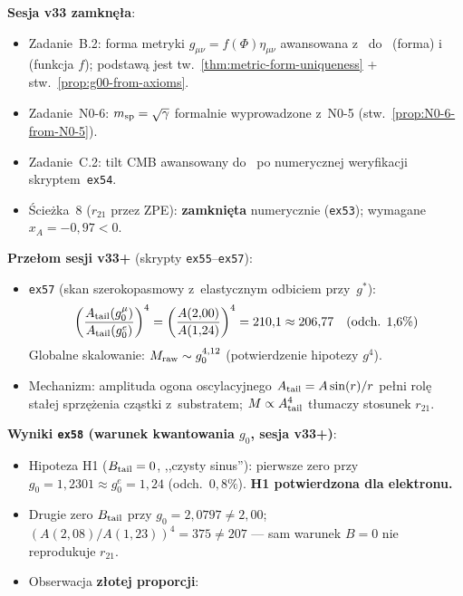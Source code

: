 \begin{remark}\label{rem:status-priority}
\textbf{Sesja v33 zamkn\k{e}\l{}a}:
\begin{itemize}[nosep]
  \item Zadanie~B.2: forma metryki
    $g_{\mu\nu} = f(\Phi)\eta_{\mu\nu}$ awansowana
    z~ do~ (forma)
    i~ (funkcja $f$);
    podstaw\k{a} jest tw.~\ref{thm:metric-form-uniqueness}
    + stw.~\ref{prop:g00-from-axioms}.
  \item Zadanie~N0-6: $m_{\rm sp} = \sqrt{\gamma}$ formalnie wyprowadzone
    z~N0-5 (stw.~\ref{prop:N0-6-from-N0-5}).
  \item Zadanie~C.2: tilt CMB awansowany do~
    po numerycznej weryfikacji skryptem~\texttt{ex54}.
  \item \'Scie\.zka~8 ($r_{21}$ przez ZPE): \textbf{zamkni\k{e}ta} numerycznie
    (\texttt{ex53}); wymagane $x_A = -0{,}97 < 0$.
\end{itemize}
\textbf{Prze\l{}om sesji v33+} (skrypty \texttt{ex55}--\texttt{ex57}):
\begin{itemize}[nosep]
  \item \texttt{ex57} (skan szerokopasmowy z~elastycznym odbiciem przy~$g^*$):
    \[
      \left(\frac{A_{\rm tail}(g_0^\mu)}{A_{\rm tail}(g_0^e)}\right)^4
      = \left(\frac{A(2{,}00)}{A(1{,}24)}\right)^4 = 210{,}1
      \approx 206{,}77 \quad (\text{odch. }1{,}6\%)
    \]
    Globalne skalowanie: $M_{\rm raw} \sim g_0^{4{,}12}$ (potwierdzenie hipotezy $g^4$).
  \item Mechanizm: amplituda ogona oscylacyjnego $A_{\rm tail} = A\sin(r)/r$
    pe\l{}ni rol\k{e} sta\l{}ej sprz\k{e}\.zenia cz\k{a}stki z~substratem;
    $M \propto A_{\rm tail}^4$ t\l{}umaczy stosunek $r_{21}$.
\end{itemize}
\textbf{Wyniki \texttt{ex58} (warunek kwantowania $g_0$, sesja v33+)}:
\begin{itemize}[nosep]
  \item Hipoteza H1 ($B_{\rm tail}=0$, ,,czysty sinus''):
    pierwsze zero przy $g_0 = 1{,}2301 \approx g_0^e = 1{,}24$
    (odch.~$0{,}8\%$). \textbf{H1 potwierdzona dla elektronu.}
  \item Drugie zero $B_{\rm tail}$ przy $g_0 = 2{,}0797 \neq 2{,}00$;
    $(A(2{,}08)/A(1{,}23))^4 = 375 \neq 207$ ---
    sam warunek $B=0$ nie reprodukuje $r_{21}$.
  \item Obserwacja \textbf{z\l{}otej proporcji}:

\end{itemize}
\end{remark}

